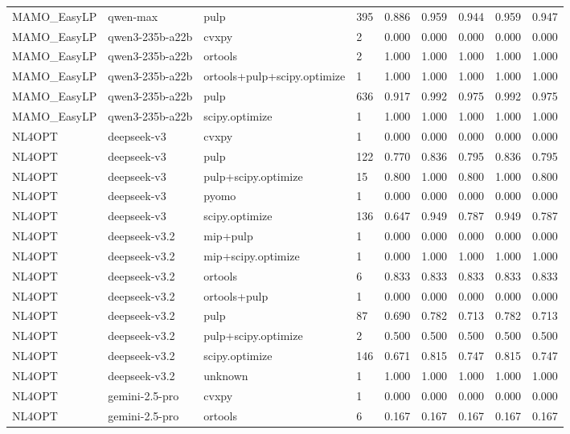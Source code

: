 \begin{table}[t]
\begin{tabular}{lllllllll}
MAMO\_EasyLP & qwen-max & pulp & 395 & 0.886 & 0.959 & 0.944 & 0.959 & 0.947 \\
MAMO\_EasyLP & qwen3-235b-a22b & cvxpy & 2 & 0.000 & 0.000 & 0.000 & 0.000 & 0.000 \\
MAMO\_EasyLP & qwen3-235b-a22b & ortools & 2 & 1.000 & 1.000 & 1.000 & 1.000 & 1.000 \\
MAMO\_EasyLP & qwen3-235b-a22b & ortools+pulp+scipy.optimize & 1 & 1.000 & 1.000 & 1.000 & 1.000 & 1.000 \\
MAMO\_EasyLP & qwen3-235b-a22b & pulp & 636 & 0.917 & 0.992 & 0.975 & 0.992 & 0.975 \\
MAMO\_EasyLP & qwen3-235b-a22b & scipy.optimize & 1 & 1.000 & 1.000 & 1.000 & 1.000 & 1.000 \\
NL4OPT & deepseek-v3 & cvxpy & 1 & 0.000 & 0.000 & 0.000 & 0.000 & 0.000 \\
NL4OPT & deepseek-v3 & pulp & 122 & 0.770 & 0.836 & 0.795 & 0.836 & 0.795 \\
NL4OPT & deepseek-v3 & pulp+scipy.optimize & 15 & 0.800 & 1.000 & 0.800 & 1.000 & 0.800 \\
NL4OPT & deepseek-v3 & pyomo & 1 & 0.000 & 0.000 & 0.000 & 0.000 & 0.000 \\
NL4OPT & deepseek-v3 & scipy.optimize & 136 & 0.647 & 0.949 & 0.787 & 0.949 & 0.787 \\
NL4OPT & deepseek-v3.2 & mip+pulp & 1 & 0.000 & 0.000 & 0.000 & 0.000 & 0.000 \\
NL4OPT & deepseek-v3.2 & mip+scipy.optimize & 1 & 0.000 & 1.000 & 1.000 & 1.000 & 1.000 \\
NL4OPT & deepseek-v3.2 & ortools & 6 & 0.833 & 0.833 & 0.833 & 0.833 & 0.833 \\
NL4OPT & deepseek-v3.2 & ortools+pulp & 1 & 0.000 & 0.000 & 0.000 & 0.000 & 0.000 \\
NL4OPT & deepseek-v3.2 & pulp & 87 & 0.690 & 0.782 & 0.713 & 0.782 & 0.713 \\
NL4OPT & deepseek-v3.2 & pulp+scipy.optimize & 2 & 0.500 & 0.500 & 0.500 & 0.500 & 0.500 \\
NL4OPT & deepseek-v3.2 & scipy.optimize & 146 & 0.671 & 0.815 & 0.747 & 0.815 & 0.747 \\
NL4OPT & deepseek-v3.2 & unknown & 1 & 1.000 & 1.000 & 1.000 & 1.000 & 1.000 \\
NL4OPT & gemini-2.5-pro & cvxpy & 1 & 0.000 & 0.000 & 0.000 & 0.000 & 0.000 \\
NL4OPT & gemini-2.5-pro & ortools & 6 & 0.167 & 0.167 & 0.167 & 0.167 & 0.167 \\

\end{tabular}
\end{table}
